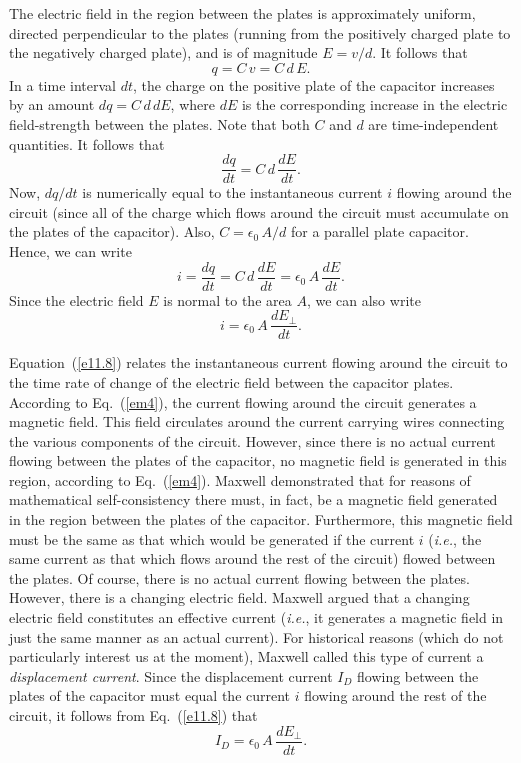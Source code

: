 The electric field in the region between the plates is approximately uniform,
directed perpendicular to the plates (running from the positively charged plate
to the negatively charged plate), and is of magnitude $E= v/d$. It follows
that
\begin{equation}
q = C\,v = C\,d\,E.
\end{equation}
In a time interval $dt$, the charge on the positive
plate of the capacitor increases by an amount
$dq = C\,d\,d E$,
 where  $dE$ is the
corresponding increase in the electric field-strength between the plates.
Note that both $C$ and $d$ are time-independent quantities. It follows
that 
\begin{equation}
\frac{dq}{d t} = C\,d\,\frac{dE}{dt}.
\end{equation}
Now, $dq/d t$ is numerically equal to the
instantaneous current $i$ flowing around the circuit (since all of the
charge which flows around the circuit must accumulate on the plates of
the capacitor). Also, $C=\epsilon_0\, A/d$ for a parallel plate capacitor.
Hence, we can write
\begin{equation}
i = \frac{dq}{d t} = C\,d\,\frac{d E}{dt} =\epsilon_0\,A\, \frac{d E}{d t}.
\end{equation}
Since the electric field $E$ is normal to the area $A$, we can also write
\begin{equation}\label{e11.8}
i =\epsilon_0\,A\, \frac{d E_\perp}{dt}.
\end{equation}

Equation~(\ref{e11.8}) relates the instantaneous current flowing around the
circuit to the time rate of change of the electric field between the
capacitor plates. According to Eq.~(\ref{em4}), the current flowing around the 
circuit generates a magnetic field.  This field circulates around the 
current carrying wires
connecting the various components of the circuit. However, since
there is no actual current flowing between the 
plates of the capacitor,  no magnetic field is generated in this region,
according to Eq.~(\ref{em4}). 
Maxwell demonstrated that for reasons of  mathematical self-consistency there
must, in fact,  be a magnetic field generated in the
region between the plates of the capacitor.
Furthermore, this magnetic field must be the same as that which
would be generated if the
current $i$ ({\em i.e.}, the same current as that which
flows around  the rest of the circuit)
flowed between the plates. Of course, there is no actual current flowing between
the plates. However, there is a changing electric field. Maxwell argued that a
changing electric field constitutes an effective current ({\em i.e.}, it
generates a magnetic field in just the same manner as an actual current). 
For historical reasons (which do not particularly interest us at the moment), Maxwell 
called this type of current a {\em displacement current}. 
Since the displacement
current $I_D$ flowing between the plates of the capacitor must equal the
current $i$ flowing around the rest of the circuit,  it follows from Eq.~(\ref{e11.8})
that
\begin{equation}\label{e11.9}
I_D = \epsilon_0\,A\, \frac{dE_\perp}{dt}.
\end{equation}

